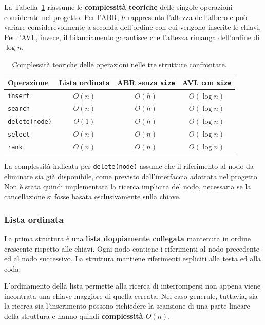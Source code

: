 \documentclass[a4paper,11pt]{article}
\begin{document}
La Tabella~\ref{tab:complessita-strutture} riassume le \textbf{complessità teoriche} delle singole operazioni considerate nel progetto.
Per l'ABR, $h$ rappresenta l'altezza dell'albero e può variare considerevolmente a seconda dell'ordine con cui vengono inserite le chiavi. Per l'AVL, invece, il bilanciamento garantisce che l'altezza rimanga dell'ordine di $\log n$.
\begin{table}[htbp]
    \centering
    \begin{tabular}{lccc}
        \toprule
        Operazione & Lista ordinata & ABR senza \texttt{size} & AVL con \texttt{size} \\
        \midrule
        \texttt{insert}       & $O(n)$      & $O(h)$      & $O(\log n)$ \\
        \texttt{search}       & $O(n)$      & $O(h)$      & $O(\log n)$ \\
        \texttt{delete(node)} & $\Theta(1)$ & $O(h)$      & $O(\log n)$ \\
        \texttt{select}       & $O(n)$      & $O(n)$      & $O(\log n)$ \\
        \texttt{rank}         & $O(n)$      & $O(n)$      & $O(\log n)$ \\
        \bottomrule
    \end{tabular}
    \caption{Complessità teoriche delle operazioni nelle tre strutture confrontate.}
    \label{tab:complessita-strutture}
\end{table}

La complessità indicata per \texttt{delete(node)} assume che il riferimento al nodo da eliminare sia già disponibile, come previsto dall'interfaccia adottata nel progetto. Non è stata quindi implementata la ricerca implicita del nodo, necessaria se la cancellazione si fosse basata esclusivamente sulla chiave. 



\subsubsection{Lista ordinata}
La prima struttura è una \textbf{lista doppiamente collegata} mantenuta in ordine crescente rispetto alle chiavi. Ogni nodo contiene i riferimenti al nodo precedente ed al nodo successivo. La struttura mantiene riferimenti espliciti alla testa ed alla coda. 

L'ordinamento della lista permette alla ricerca di interrompersi non appena viene incontrata una chiave maggiore di quella cercata. Nel caso generale, tuttavia, sia la ricerca sia l'inserimento possono richiedere la scansione di una parte lineare della struttura e hanno quindi \textbf{complessità $O(n)$}.
\end{document}
